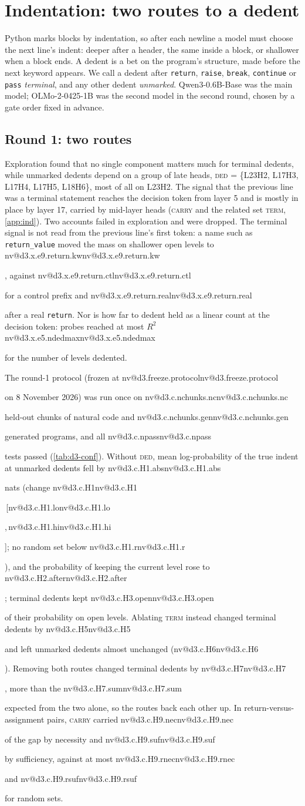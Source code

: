 \documentclass[11pt]{article}
\makeatletter
\newcommand{\nv}[1]{\ifcsname nv@#1\endcsname\csname nv@#1\endcsname\else\PackageError{numbers}{Unknown number key #1}{}\fi}
\newcommand{\ci}[2]{\,[#1,\,#2]}
\newcommand{\hd}[2]{L#1H#2}
\newcommand{\code}[1]{\texttt{#1}}
\newcommand{\ded}{\textsc{ded}}
\newcommand{\term}{\textsc{term}}
\newcommand{\carry}{\textsc{carry}}
\newcommand{\qsix}{Qwen3-0.6B-Base}
\newcommand{\olmo}{OLMo-2-0425-1B}
\makeatother
\begin{document}
\section{Indentation: two routes to a dedent}
\label{sec:ind}

Python marks blocks by indentation, so after each newline a model must choose the next line's indent: deeper after a header, the same inside a block, or shallower when a block ends. A dedent is a bet on the program's structure, made before the next keyword appears. We call a dedent after \code{return}, \code{raise}, \code{break}, \code{continue} or \code{pass} \emph{terminal}, and any other dedent \emph{unmarked}. \qsix{} was the main model; \olmo{} was the second model in the second round, chosen by a gate order fixed in advance.

\subsection{Round 1: two routes}

Exploration found that no single component matters much for terminal dedents, while unmarked dedents depend on a group of late heads, \ded{} = \{\hd{23}{2}, \hd{17}{3}, \hd{17}{4}, \hd{17}{5}, \hd{18}{6}\}, most of all on \hd{23}{2}. The signal that the previous line was a terminal statement reaches the decision token from layer 5 and is mostly in place by layer 17, carried by mid-layer heads (\carry{} and the related set \term{}, \cref{app:ind}). Two accounts failed in exploration and were dropped. The terminal signal is not read from the previous line's first token: a name such as \code{return\_value} moved the mass on shallower open levels to \nv{d3.x.e9.return.kw}, against \nv{d3.x.e9.return.ctl} for a control prefix and \nv{d3.x.e9.return.real} after a real \code{return}. Nor is how far to dedent held as a linear count at the decision token: probes reached at most $R^2$ \nv{d3.x.e5.ndedmax} for the number of levels dedented.

The round-1 protocol (frozen at \nv{d3.freeze.protocol} on 8 November 2026) was run once on \nv{d3.c.nchunks.nc} held-out chunks of natural code and \nv{d3.c.nchunks.gen} generated programs, and all \nv{d3.c.npass} tests passed (\cref{tab:d3-conf}). Without \ded{}, mean log-probability of the true indent at unmarked dedents fell by \nv{d3.c.H1.abs} nats (change \nv{d3.c.H1}\ci{\nv{d3.c.H1.lo}}{\nv{d3.c.H1.hi}}; no random set below \nv{d3.c.H1.r}), and the probability of keeping the current level rose to \nv{d3.c.H2.after}; terminal dedents kept \nv{d3.c.H3.open} of their probability on open levels. Ablating \term{} instead changed terminal dedents by \nv{d3.c.H5} and left unmarked dedents almost unchanged (\nv{d3.c.H6}). Removing both routes changed terminal dedents by \nv{d3.c.H7}, more than the \nv{d3.c.H7.sum} expected from the two alone, so the routes back each other up. In return-versus-assignment pairs, \carry{} carried \nv{d3.c.H9.nec} of the gap by necessity and \nv{d3.c.H9.suf} by sufficiency, against at most \nv{d3.c.H9.rnec} and \nv{d3.c.H9.rsuf} for random sets.
\end{document}
